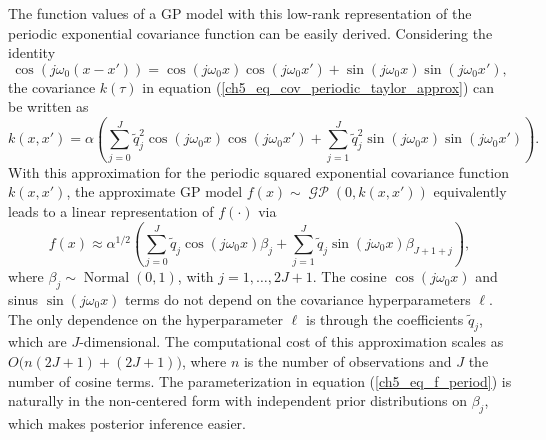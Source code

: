 \documentclass[onecolumn,a4paper,11pt]{article}
\DeclareMathOperator{\GP}{\mathcal{GP}}
\DeclareMathOperator{\Normal}{Normal}
\begin{document}
The function values of a GP model with this low-rank representation of the periodic exponential covariance function can be easily derived. Considering the identity
%
\begin{equation*}
\cos(j\omega_0 (x-x'))=\cos(j\omega_0 x) \cos(j\omega_0 x') + \sin(j\omega_0 x) \sin(j\omega_0 x'),
\end{equation*}
the covariance $k(\tau)$ in equation (\ref{ch5_eq_cov_periodic_taylor_approx}) can be written as
%
\begin{equation} \label{ch5_eq_cov_periodic_taylor_approx_2}
k(x,x')= \alpha \left( \sum_{j=0}^{J} \tilde{q}_j^2 \cos(j\omega_0 x)  \cos(j\omega_0 x') + \sum_{j=1}^{J} \tilde{q}_j^2 \sin(j\omega_0 x) \sin(j\omega_0 x') \right).
\end{equation}
With this approximation for the periodic squared exponential covariance function $k(x,x')$, the approximate GP model $f(x) \sim \GP\left(0,k(x,x')\right)$ equivalently leads to a linear representation of $f(\cdot)$ via
%
\begin{equation} \label{ch5_eq_f_period}
f(x) \approx \alpha^{1/2} \left( \sum_{j=0}^J  \tilde{q}_j \cos(j\omega_0 x) \beta_j +  \sum_{j=1}^J \tilde{q}_j \sin(j\omega_0 x) \beta_{J+1+j} \right),
\end{equation}
where $\beta_j \sim \Normal(0,1)$, with $j=1,\dots,2J+1$. The cosine $\cos(j\omega_0 x)$ and sinus $\sin(j\omega_0 x)$ terms do not depend on the covariance hyperparameters $\ell$. The only dependence on the hyperparameter $\ell$ is through the coefficients $\tilde{q}_j$, which are $J$-dimensional. The computational cost of this approximation scales as $O\big(n(2J+1) + (2J+1)\big)$, where $n$ is the number of observations and $J$ the number of cosine terms.
The parameterization in equation (\ref{ch5_eq_f_period}) is naturally in the non-centered form with independent prior distributions on
$\beta_j$, which makes posterior inference easier.






\end{document}
